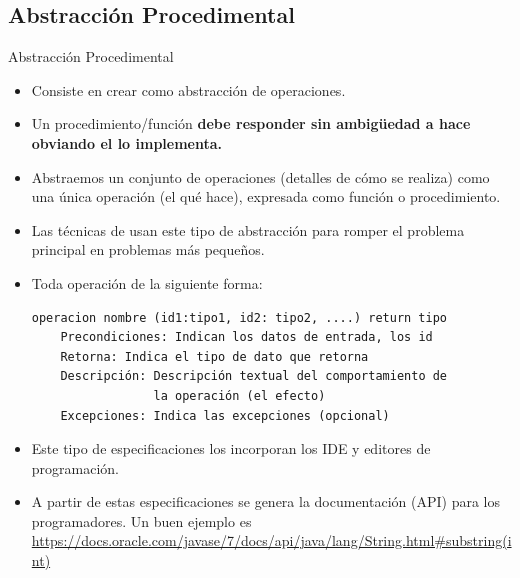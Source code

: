 \documentclass[10pt,envcountsect,spanish]{beamer}
\begin{document}
\subsection{Abstracción Procedimental}

\begin{frame}[fragile]{Abstracción Procedimental}
\begin{itemize}%
\item Consiste en crear  como abstracción de operaciones.

\item Un procedimiento/función \textbf{debe responder sin ambigüedad a  hace obviando el  lo implementa.}

\item Abstraemos un conjunto de operaciones (detalles de cómo se realiza) como una única operación (el qué hace), expresada como función o procedimiento.

\item Las técnicas de  usan este tipo de abstracción para romper el problema principal en problemas más pequeños.
\item Toda operación   de la siguiente forma:
\small
\begin{Verbatim}[frame=single]
operacion nombre (id1:tipo1, id2: tipo2, ....) return tipo
    Precondiciones: Indican los datos de entrada, los id
    Retorna: Indica el tipo de dato que retorna
    Descripción: Descripción textual del comportamiento de 
                 la operación (el efecto)
    Excepciones: Indica las excepciones (opcional)
\end{Verbatim}

\item Este tipo de especificaciones los incorporan los IDE y editores de programación.

\item A partir de estas especificaciones se genera la documentación (API) para los programadores.
Un buen ejemplo es  
\url{https://docs.oracle.com/javase/7/docs/api/java/lang/String.html#substring(int)}
\end{itemize}
\end{frame}


\end{document}
